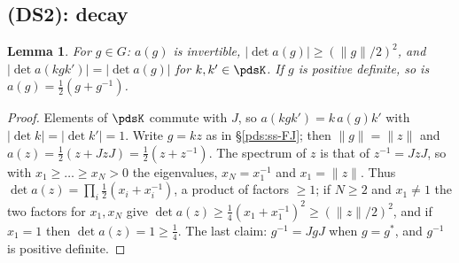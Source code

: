 \documentclass[10pt]{amsart}
\newtheorem{lemma}[theorem]{Lemma}
\theoremstyle{definition}
\theoremstyle{remark}
\begin{document}
\subsection{(DS2): decay}\label{pds:ss-ds2}

\begin{lemma}\label{pds:blockdet}
For $g\in G$: $a(g)$ is invertible, $|\det a(g)|\ge(\|g\|/2)^2$, and $|\det a(kgk')|=|\det a(g)|$ for
$k,k'\in\pdsK$. If $g$ is positive definite, so is $a(g)=\frac12(g+g^{-1})$.
\end{lemma}
\begin{proof}
Elements of $\pdsK$ commute with $J$, so $a(kgk')=k\,a(g)k'$ with $|\det k|=|\det k'|=1$. Write
$g=kz$ as in \S\ref{pds:ss-FJ}; then $\|g\|=\|z\|$ and $a(z)=\frac12(z+JzJ)=\frac12(z+z^{-1})$.
The spectrum of $z$ is that of $z^{-1}=JzJ$, so with $x_1\ge\dots\ge x_N>0$ the eigenvalues,
$x_N=x_1^{-1}$ and $x_1=\|z\|$. Thus $\det a(z)=\prod_i\frac12(x_i+x_i^{-1})$, a product of factors
$\ge1$; if $N\ge2$ and $x_1\ne1$ the two factors for $x_1,x_N$ give $\det a(z)\ge\frac14(x_1+
x_1^{-1})^2\ge(\|z\|/2)^2$, and if $x_1=1$ then $\det a(z)=1\ge\frac14$. The last claim: $g^{-1}=
JgJ$ when $g=g^*$, and $g^{-1}$ is positive definite.
\end{proof}
\end{document}
